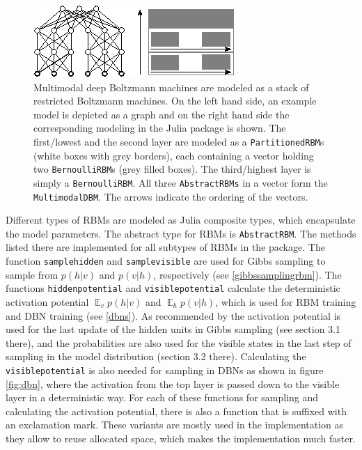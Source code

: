 \documentclass[12pt]{article}
\newcommand{\inlinecode}[1]{\texttt{#1}}
\DeclareMathOperator{\EX}{\mathbb{E}}
\begin{document}
\begin{figure}[h]
   \centering
   \includegraphics[scale=3.]{images/MDBMImpl.eps}
   \caption{Multimodal deep Boltzmann machines are modeled as a stack of restricted Boltzmann machines. On the left hand side, an example model is depicted as a graph and on the right hand side the corresponding modeling in the Julia package is shown.
   The first/lowest and the second layer are modeled as a \inlinecode{PartitionedRBM}s (white boxes with grey borders), each containing a vector holding two \inlinecode{BernoulliRBM}s (grey filled boxes).
   The third/highest layer is simply a \inlinecode{BernoulliRBM}.
   All three \inlinecode{AbstractRBMs} in a vector form the \inlinecode{MultimodalDBM}.
   The arrows indicate the ordering of the vectors.}
\label{mdbmimplasstack}
\end{figure}

Different types of RBMs are modeled as Julia composite types, which encapsulate the model parameters.
The abstract type for RBMs is \inlinecode{AbstractRBM}.
The methods listed there are implemented for all subtypes of RBMs in the package.
The function \inlinecode{samplehidden} and \inlinecode{samplevisible} are used for Gibbs sampling to sample from $p(h|v)$ and $p(v|h)$, respectively (see \ref{gibbssamplingrbm}).
The functions \inlinecode{hiddenpotential} and \inlinecode{visiblepotential} calculate the deterministic activation potential $\EX_v p(h|v)$ and $\EX_h p(v|h)$, which is used for RBM training and DBN training (see \ref{dbns}).
As recommended by \cite{hinton_practical_2012} the activation potential is used for the last update of the hidden units in Gibbs sampling (see section 3.1 there), and the probabilities are also used for the visible states in the last step of sampling in the model distribution (section 3.2 there).
Calculating the \inlinecode{visiblepotential} is also needed for sampling in DBNs as shown in figure \ref{fig:dbn}, where the activation from the top layer is passed down to the visible layer in a deterministic way.
For each of these functions for sampling and calculating the activation potential, there is also a function that is suffixed with an exclamation mark.
These variants are mostly used in the implementation as they allow to reuse allocated space, which makes the implementation much faster.
\end{document}
